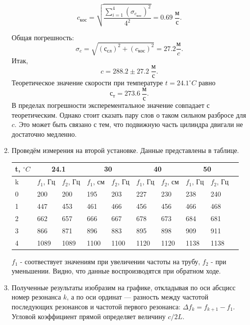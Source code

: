 \documentclass[a4paper,12pt]{article}
\begin{document}
\begin{enumerate}
		$$ c_{кос} = \sqrt{\frac{\sum_{i=1}^{4} (\sigma_{c_{кос}})^2}{4^2}} = 0.69 \; \frac{м}{с}.$$
		
		Общая погрешность: $$\sigma_{c} = \sqrt{(с_{сл})^2+(c_{кос})^2} = 27.2\frac{м}{c}.$$
		Итак, $$c = 288.2 \pm 27.2 \; \frac{м}{с}.$$
		Теоретическое значение скорости при температуре $t = 24.1 ^\circ C$ равно $$с_{т} = 273.6 \: \frac{м}{с}.$$
		В пределах погрешности эксперементальное значение совпадает с теоретическим.
		Однако стоит сказать пару слов о таком сильном разбросе для $c$. Это может быть связано с тем, что подвижную часть цилиндра двигали не достаточно медленно.
		
		
		\item Проведём измерения на второй установке. Данные представлены в таблице.
		
			\begin{center}
			\begin{tabular}{|l|l|l|l|l|l|l|l|l|l|}
			\hline
			t, $^\circ C$ & \multicolumn{2}{|c|}{24.1} & \multicolumn{2}{|c|}{30}&  \multicolumn{2}{|c|}{40} & \multicolumn{2}{|c|}{50}
			\\
			\hline
			k &  $f_1$, Гц & $f_2$, Гц & $f_1$, см & $f_2$, Гц & $f_1$, Гц & $f_2$, см & $f_1$, Гц & $f_2$, Гц
			\\
			\hline
			0 & 200 & 200 & 195 & 203 & 227 & 230 & 238 & 240
			\\
			\hline
			1 & 447 & 453 & 461 & 466 & 456 & 456 & 466 & 468
			\\
			\hline
			2 & 662 & 657 & 666 & 667 & 678 & 673 & 684 & 681
			\\
			\hline
			3 & 866 & 871 & 896 & 883 & 895 &  898 & 909 & 911
			\\
			\hline
			4 & 1089 & 1089 & 1100 & 1100 & 1120 & 1120 & 1138 & 1138
			\\
			\hline
		\end{tabular}
		\end{center}
		
		$f_1$ - соотвествует значениям при увеличении частоты на трубу, $f_2$ - при уменьшении. Видно, что данные воспроизводятся при обратном ходе.		


		\item Полученные результаты изобразим на графике, откладывая
		по оси абсцисс номер резонанса $k$, а по оси ординат — разность между частотой последующих резонансов и частотой первого резонанса: $\Delta f_k = f_{k+1}-f_1.$ Угловой
		коэффициент прямой определяет величину $c/2L$.
		
\begin{center}
	\begin{tabular}{lr}
		

\end{tabular}
\end{center}
\end{enumerate}
\end{document}
